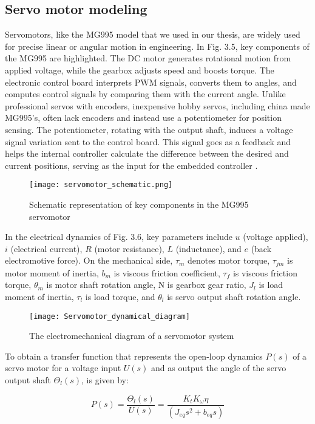 \subsection{Servo motor modeling}
Servomotors, like the MG995 model that we used in our thesis, are widely used for precise linear or angular motion in engineering. In Fig. 3.5, key components of the MG995 are highlighted. The DC motor generates rotational motion from applied voltage, while the gearbox adjusts speed and boosts torque. The electronic control board interprets PWM signals, converts them to angles, and computes control signals by comparing them with the current angle. Unlike professional servos with encoders, inexpensive hobby servos, including china made MG995's, often lack encoders and instead use a potentiometer for position sensing. The potentiometer, rotating with the output shaft, induces a voltage signal variation sent to the control board. This signal goes as a feedback and helps the internal controller calculate the difference between the desired and current positions, serving as the input for the embedded controller \cite{santanacob}.
\begin{figure}[h]
    \centering
    \texttt{[image: servomotor\_schematic.png]}
    \caption{Schematic representation of key components in the MG995 servomotor}
\end{figure}
In the electrical dynamics of Fig. 3.6, key parameters include \(u\) (voltage applied), \(i\) (electrical current), \(R\) (motor resistance), \(L\) (inductance), and \(e\) (back electromotive force). On the mechanical side, \(\tau_m\) denotes motor torque, \(\tau_{jm}\) is motor moment of inertia, \(b_m\) is viscous friction coefficient, \(\tau_f\) is viscous friction torque, \(\theta_m\) is motor shaft rotation angle, N is gearbox gear ratio, \(J_l\) is load moment of inertia, \(\tau_l\) is load torque, and \(\theta_l\) is servo output shaft rotation angle.
\begin{figure}[h]
    \centering
    \texttt{[image: Servomotor\_dynamical\_diagram]}
    \caption{The electromechanical diagram of a servomotor system}
\end{figure}
 To obtain a transfer function that represents the open-loop dynamics $P(s)$ of a servo motor for a voltage input $U(s)$ and as output the angle of the servo output shaft $\Theta_l(s)$, is given by:

\begin{equation}P(s) = \frac{\Theta_l(s)}{U(s)} = \frac{K_t K_\omega \eta}{(J_{eq}s^2 + b_{eq}s)}
\end{equation}

